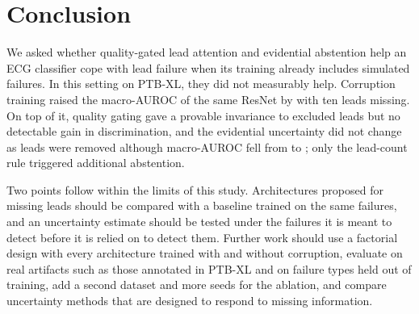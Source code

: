 \section{Conclusion}
\label{sec:conclusion}

We asked whether quality-gated lead attention and evidential abstention help an ECG classifier cope with lead
failure when its training already includes simulated failures. In this setting on PTB-XL, they did not measurably
help. Corruption training raised the macro-AUROC of the same ResNet by \gainDropKTen{} with ten leads missing. On top
of it, quality gating gave a provable invariance to excluded leads but no detectable gain in discrimination, and the
evidential uncertainty did not change as leads were removed although macro-AUROC fell from \aucLgEdlKZero{} to
\aucLgEdlKTen; only the lead-count rule triggered additional abstention.

Two points follow within the limits of this study. Architectures proposed for missing leads should be compared with
a baseline trained on the same failures, and an uncertainty estimate should be tested under the failures it is meant
to detect before it is relied on to detect them. Further work should use a factorial design with every architecture
trained with and without corruption, evaluate on real artifacts such as those annotated in PTB-XL and on failure
types held out of training, add a second dataset and more seeds for the ablation, and compare uncertainty methods
that are designed to respond to missing information.
